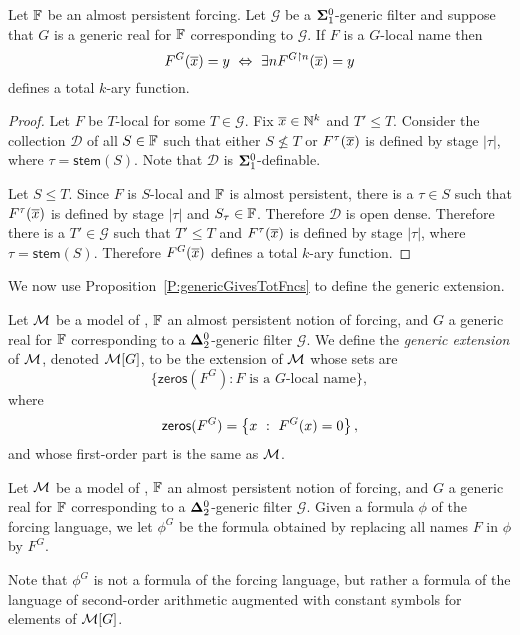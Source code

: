 \begin{prop}\label{P:genericGivesTotFncs}
Let $\mathbb{F}$ be an almost persistent forcing.
Let $\mathcal{G}$ be a $\mathbf{\Sigma}^0_1$-generic filter and
suppose that $G$ is a generic real for $\mathbb{F}$ corresponding to $\mathcal{G}$.
If $F$ is a $G$-local name then
$$F^G(\tup{x})=y\ \Leftrightarrow\ \exists nF^{G\uhr n}(\tup{x})=y$$
defines a total $k$-ary function.
\end{prop}
\begin{proof}
Let $F$ be $T$-local for some $T\in\mathcal{G}$.
Fix $\overline{x}\in\mathbb{N}^k$ and $T'\leq T$.
Consider the collection $\mathcal{D}$ of all $S\in\mathbb{F}$
such that either $S\not\leq T$ or
$F^\tau(\overline{x})$ is defined by stage $|\tau|$,
where $\tau=\mathsf{stem}(S)$.
Note that $\mathcal{D}$ is $\mathbf{\Sigma}^0_1$-definable.

Let $S\leq T$.
Since $F$ is $S$-local and $\mathbb{F}$ is almost persistent,
there is a $\tau\in S$ such that $F^\tau(\overline{x})$ is defined by stage $|\tau|$
and $S_\tau\in\mathbb{F}$.
Therefore $\mathcal{D}$ is open dense.
Therefore there is a $T'\in\mathcal{G}$ such that
$T'\leq T$ and $F^\tau(\overline{x})$ is defined by stage $|\tau|$,
where $\tau=\mathsf{stem}(S)$.
Therefore $F^G(\overline{x})$ defines a total $k$-ary function.
\end{proof}

We now use Proposition~\ref{P:genericGivesTotFncs} to define the generic extension.

\begin{definition}
Let $\mathcal{M}$ be a model of \RCAo, $\mathbb{F}$ an almost persistent notion of forcing,
and $G$ a generic real for $\mathbb{F}$
corresponding to a $\mathbf{\Delta}^0_2$-generic filter $\mathcal{G}$.
We define the \textit{generic extension} of $\mathcal{M}$,
denoted $\MM[G]$\index{$\MM[G]$}, to be the extension of $\mathcal{M}$
whose sets are
$$\{\mathsf{zeros}(F^G):F\text{ is a }G\text{-local name}\},$$
where
$$\mathsf{zeros}(F^G)=\left\{x\ :\ F^G(x)=0\right\},$$
and whose first-order part is the same as $\mathcal{M}$.
\end{definition}

\begin{definition}
Let $\mathcal{M}$ be a model  of \RCAo, $\mathbb{F}$ an almost persistent notion of forcing, and $G$ a generic real for $\mathbb{F}$
corresponding to a $\mathbf{\Delta}^0_2$-generic filter $\mathcal{G}$.
Given a formula $\phi$ of the forcing language,
we let $\phi^G$ be the formula obtained by replacing
all names $F$ in $\phi$ by $F^G$.

Note that $\phi^G$ is not a formula of the forcing language,
but rather a formula of the language of second-order arithmetic
augmented with constant symbols for elements of $\MM[G]$.
\end{definition}

